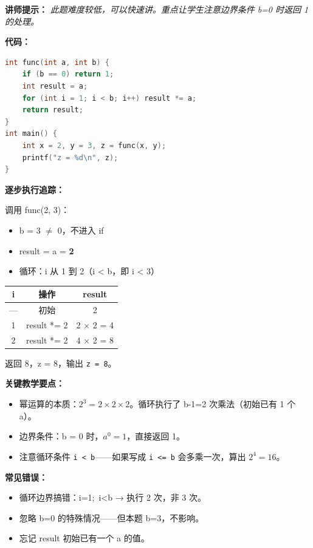 \medskip
\textbf{讲师提示：} \textit{此题难度较低，可以快速讲。重点让学生注意边界条件 b=0 时返回 1 的处理。}

\smallskip
\textbf{代码：}
\begin{lstlisting}[language=C]
int func(int a, int b) {
    if (b == 0) return 1;
    int result = a;
    for (int i = 1; i < b; i++) result *= a;
    return result;
}
int main() {
    int x = 2, y = 3, z = func(x, y);
    printf("z = %d\n", z);
}
\end{lstlisting}

\smallskip
\textbf{逐步执行追踪：}

\noindent 调用 func(2, 3)：

\begin{itemize}
    \item b = 3 $\neq$ 0，不进入 if
    \item result = a = \textbf{2}
    \item 循环：i 从 1 到 2（i < b，即 i < 3）
\end{itemize}

\begin{center}
\begin{tabular}{c|c|c}
\hline
\textbf{i} & \textbf{操作} & \textbf{result} \\
\hline
— & 初始 & 2 \\
1 & result *= 2 & 2 × 2 = 4 \\
2 & result *= 2 & 4 × 2 = 8 \\
\hline
\end{tabular}
\end{center}

\noindent 返回 8，z = 8，输出 \texttt{z = 8}。

\textbf{关键教学要点：}
\begin{itemize}
    \item 幂运算的本质：$2^3 = 2 \times 2 \times 2$。循环执行了 b-1=2 次乘法（初始已有 1 个 a）。
    \item 边界条件：b = 0 时，$a^0 = 1$，直接返回 1。
    \item 注意循环条件 \texttt{i < b}——如果写成 \texttt{i <= b} 会多乘一次，算出 $2^4 = 16$。
\end{itemize}

\textbf{常见错误：}
\begin{itemize}
    \item 循环边界搞错：i=1;\ i<b → 执行 2 次，非 3 次。
    \item 忽略 b=0 的特殊情况——但本题 b=3，不影响。
    \item 忘记 result 初始已有一个 a 的值。
\end{itemize}

